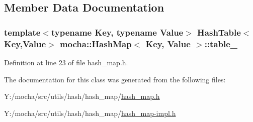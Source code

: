 \subsection{Member Data Documentation}
\hypertarget{classmocha_1_1_hash_map_af489c982641060de9bc6ea74193d0c93}{
\subsubsection[{table\_\-}]{\setlength{\rightskip}{0pt plus 5cm}template$<$typename Key, typename Value$>$ {\bf HashTable}$<$Key,Value$>$ {\bf mocha::HashMap}$<$ Key, Value $>$::{\bf table\_\-}}}
\label{classmocha_1_1_hash_map_af489c982641060de9bc6ea74193d0c93}


Definition at line 23 of file hash\_\-map.h.



The documentation for this class was generated from the following files:\begin{DoxyCompactItemize}
\item 
Y:/mocha/src/utils/hash/hash\_\-map/\hyperlink{hash__map_8h}{hash\_\-map.h}\item 
Y:/mocha/src/utils/hash/hash\_\-map/\hyperlink{hash__map-impl_8h}{hash\_\-map-\/impl.h}\end{DoxyCompactItemize}
